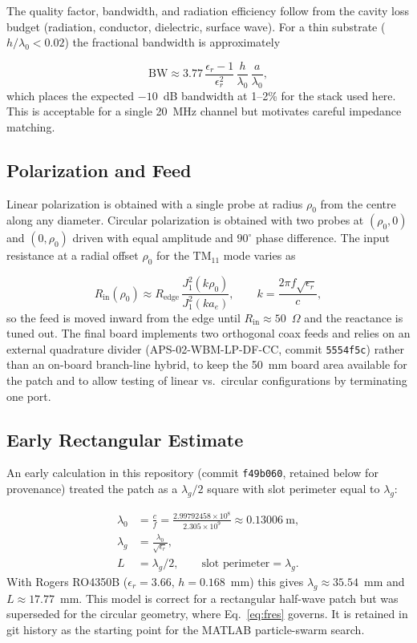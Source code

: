 The quality factor, bandwidth, and radiation efficiency follow from the cavity loss budget (radiation, conductor, dielectric, surface wave). For a thin substrate ($h/\lambda_0 < 0.02$) the fractional bandwidth is approximately

\begin{equation}
    \mathrm{BW} \approx 3.77 \, \frac{\epsilon_r -1}{\epsilon_r^{2}} \, \frac{h}{\lambda_0} \, \frac{a}{\lambda_0} ,
\end{equation}
which places the expected $-10$~dB bandwidth at 1--2\% for the stack used here. This is acceptable for a single 20~MHz channel but motivates careful impedance matching.

\subsection{Polarization and Feed}

Linear polarization is obtained with a single probe at radius $\rho_0$ from the centre along any diameter. Circular polarization is obtained with two probes at $(\rho_0, 0)$ and $(0, \rho_0)$ driven with equal amplitude and $90^{\circ}$ phase difference. The input resistance at a radial offset $\rho_0$ for the $\mathrm{TM}_{11}$ mode varies as

\begin{equation}
    R_{\mathrm{in}}(\rho_0) \approx R_{\mathrm{edge}} \, \frac{J_1^{2}(k \rho_0)}{J_1^{2}(k a_e)},
    \qquad k = \frac{2\pi f \sqrt{\epsilon_r}}{c},
\end{equation}
so the feed is moved inward from the edge until $R_{\mathrm{in}} \approx 50$~$\Omega$ and the reactance is tuned out. The final board implements two orthogonal coax feeds and relies on an external quadrature divider (APS-02-WBM-LP-DF-CC, commit \texttt{5554f5c}) rather than an on-board branch-line hybrid, to keep the 50~mm board area available for the patch and to allow testing of linear vs.\ circular configurations by terminating one port.

\subsection{Early Rectangular Estimate}

An early calculation in this repository (commit \texttt{f49b060}, retained below for provenance) treated the patch as a $\lambda_g/2$ square with slot perimeter equal to $\lambda_g$:

\begin{align}
    \lambda_0 &= \frac{c}{f} = \frac{2.99792458\times10^{8}}{2.305\times10^{9}} \approx 0.13006~\mathrm{m}, \\
    \lambda_g &= \frac{\lambda_0}{\sqrt{\epsilon_r}}, \\
    L &= \lambda_g/2, \qquad \text{slot perimeter} = \lambda_g .
\end{align}
With Rogers RO4350B ($\epsilon_r=3.66$, $h=0.168$~mm) this gives $\lambda_g \approx 35.54$~mm and $L\approx 17.77$~mm. This model is correct for a rectangular half-wave patch but was superseded for the circular geometry, where Eq.~\ref{eq:fres} governs. It is retained in git history as the starting point for the MATLAB particle-swarm search.

